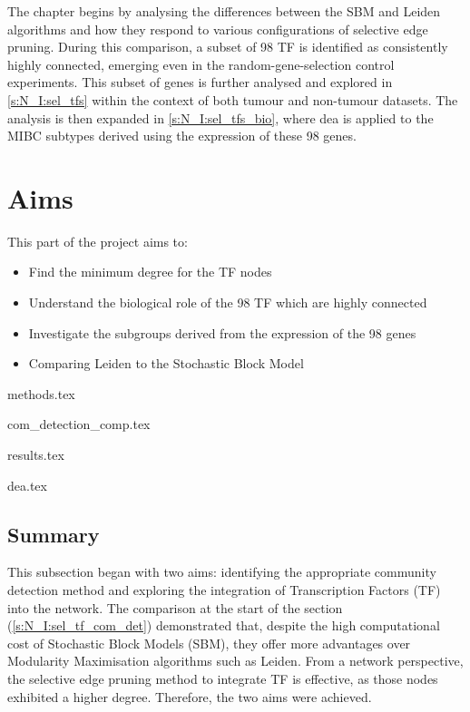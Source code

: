 The chapter begins by analysing the differences between the SBM and Leiden algorithms and how they respond to various configurations of selective edge pruning. During this comparison, a subset of 98 TF is identified as consistently highly connected, emerging even in the random-gene-selection control experiments. This subset of genes is further analysed and explored in \cref{s:N_I:sel_tfs} within the context of both tumour and non-tumour datasets. The analysis is then expanded in \cref{s:N_I:sel_tfs_bio}, where \acrfull{dea} is applied to the MIBC subtypes derived using the expression of these 98 genes.

\section{Aims}

This part of the project aims to:
\begin{itemize}
    \item Find the minimum degree for the TF nodes
    \item Understand the biological role of the 98 TF which are highly connected
    \item Investigate the subgroups derived from the expression of the 98 genes
    \item Comparing Leiden to the Stochastic Block Model
\end{itemize}


{methods.tex}

{com_detection_comp.tex}

{results.tex}

{dea.tex}


\subsection{Summary}

This subsection began with two aims: identifying the appropriate community detection method and exploring the integration of Transcription Factors (TF) into the network. The comparison at the start of the section (\ref{s:N_I:sel_tf_com_det}) demonstrated that, despite the high computational cost of Stochastic Block Models (SBM), they offer more advantages over Modularity Maximisation algorithms such as Leiden. From a network perspective, the selective edge pruning method to integrate TF is effective, as those nodes exhibited a higher degree. Therefore, the two aims were achieved.

